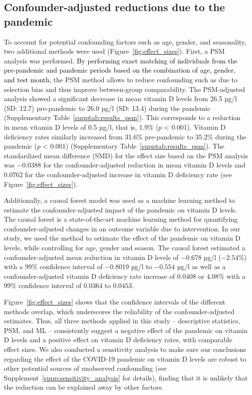 \documentclass[12pt]{article}
\newcommand{\REV}[1]{\textcolor{black}{#1}}
\begin{document}
    \subsection*{Confounder-adjusted reductions due to the pandemic} 


To account for potential confounding factors such as age, gender, and seasonality, two additional methods were used (Figure~\ref{fig:effect_sizes}). First, a PSM analysis \cite{Rosenbaum1983} was performed. \REV{By performing exact matching of individuals from the pre-pandemic and pandemic periods based on the combination of age, gender, and test month,} the PSM method allows to reduce confounding such as due to selection bias and thus improve between-group comparability. The PSM-adjusted analysis showed a significant decrease in mean vitamin D levels from 26.5 µg/l (SD: 12.7) pre-pandemic to 26.0 µg/l (SD: 13.4) during the pandemic (Supplementary Table~\ref{supptab:results_psm}). This corresponds to a reduction in mean vitamin D levels of 0.5 µg/l, that is, 1.9\% ($p$ < 0.001). Vitamin D deficiency rates similarly increased from 31.6\% pre-pandemic to 35.2\% during the pandemic ($p$ < 0.001) (Supplementary Table~\ref{supptab:results_psm}). The standardized mean difference (SMD) for the effect size based on the PSM analysis was $-0.0388$ for the confounder-adjusted reduction in mean vitamin D levels and $0.0762$ for the confounder-adjusted increase in vitamin D deficiency rate (see Figure~\ref{fig:effect_sizes}).

Additionally, a causal forest model \cite{Athey2019,Wager2018} was used as a machine learning method to estimate the confounder-adjusted impact of the pandemic on vitamin D levels. The causal forest is a state-of-the-art machine learning method for quantifying confounder-adjusted changes in an outcome variable due to intervention. In our study, we used the method to estimate the effect of the pandemic on vitamin D levels, while controlling for age, gender and season. The causal forest estimated a confounder-adjusted mean reduction in vitamin D levels of $-0.678$ µg/l ($-2.54$\%) with a 99\% confidence interval of $-0.8019$ µg/l to $-0.554$ µg/l as well as a confounder-adjusted vitamin D deficiency rate increase of $0.0408$ or $4.08$\% with a 99\% confidence interval of $0.0364$ to $0.0453$.


Figure~\ref{fig:effect_sizes} shows that the confidence intervals of the different methods overlap, which underscores the reliability of the confounder-adjusted estimates. Thus, all three methods applied in this study -- descriptive statistics, PSM, and ML -- consistently suggest a negative effect of the pandemic on vitamin D levels and a positive effect on vitamin D deficiency rates, with comparable effect sizes. We also conducted a sensitivity analysis to make sure our conclusions regarding the effect of the COVID-19 pandemic on vitamin D levels are robust to other potential sources of unobserved confounding (see Supplement~\ref{supp:sensitivity_analysis} for details), finding that it is unlikely that the reduction can be explained away by other factors. 
\end{document}
